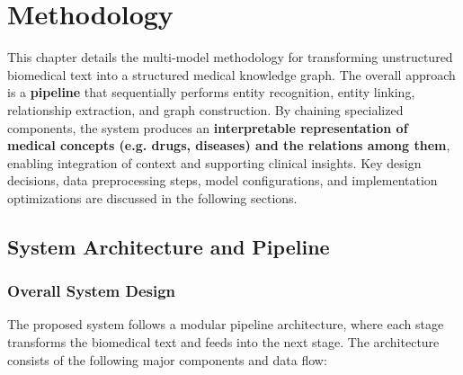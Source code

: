 
\chapter{Methodology} %

\label{Chapter3} %


This chapter details the multi-model methodology for transforming unstructured biomedical text into a structured medical knowledge graph. The overall approach is a \textbf{pipeline} that sequentially performs entity recognition, entity linking, relationship extraction, and graph construction. By chaining specialized components, the system produces an \textbf{interpretable representation of medical concepts (e.g. drugs, diseases) and the relations among them}, enabling integration of context and supporting clinical insights. Key design decisions, data preprocessing steps, model configurations, and implementation optimizations are discussed in the following sections.

\section{System Architecture and Pipeline}

\subsection{Overall System Design}

The proposed system follows a modular pipeline architecture, where each stage transforms the biomedical text and feeds into the next stage. The architecture consists of the following major components and data flow:

